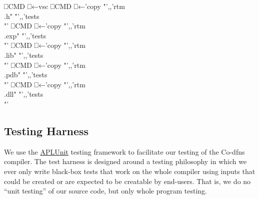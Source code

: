 \documentclass{article}%
\begin{document}
\nwenddocs{}\endmoddef\nwstartdeflinemarkup{}\nwenddeflinemarkup
⎕CMD ⎕←vsc
⎕CMD ⎕←'copy "',,'rtm\\.h" "',,'tests\\"'
⎕CMD ⎕←'copy "',,'rtm\\.exp" "',,'tests\\"'
⎕CMD ⎕←'copy "',,'rtm\\.lib" "',,'tests\\"'
⎕CMD ⎕←'copy "',,'rtm\\.pdb" "',,'tests\\"'
⎕CMD ⎕←'copy "',,'rtm\\.dll" "',,'tests\\"'
\nwendcode{}\nwdocspar

\subsection{Testing Harness}

We use the \href{https://github.com/Co-dfns/APLUnit}{APLUnit}
testing framework to facilitate our testing of the Co-dfns compiler.
The test harness is designed around a testing philosophy in which we
ever only write black-box tests that work on the whole compiler 
using inputs that could be created or are expected to be creatable 
by end-users. 
That is, we do no ``unit testing'' of our source code,
but only whole program testing.
\end{document}
